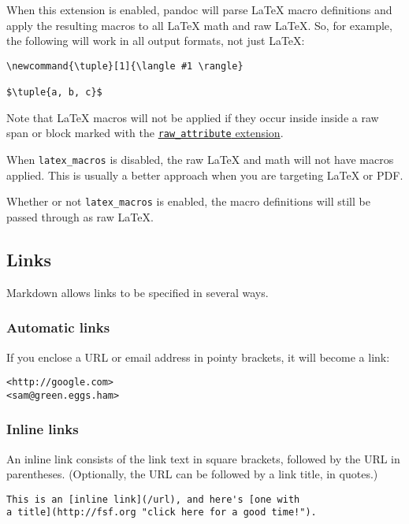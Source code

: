 \documentclass[
]{article}
\begin{document}
When this extension is enabled, pandoc will parse LaTeX macro
definitions and apply the resulting macros to all LaTeX math and raw
LaTeX. So, for example, the following will work in all output formats,
not just LaTeX:

\begin{verbatim}
\newcommand{\tuple}[1]{\langle #1 \rangle}

$\tuple{a, b, c}$
\end{verbatim}

Note that LaTeX macros will not be applied if they occur inside inside a
raw span or block marked with the
\protect\hyperlink{extension-raw_attribute}{\texttt{raw\_attribute}
extension}.

When \texttt{latex\_macros} is disabled, the raw LaTeX and math will not
have macros applied. This is usually a better approach when you are
targeting LaTeX or PDF.

Whether or not \texttt{latex\_macros} is enabled, the macro definitions
will still be passed through as raw LaTeX.

\hypertarget{links-1}{%
\subsection{Links}\label{links-1}}

Markdown allows links to be specified in several ways.

\hypertarget{automatic-links}{%
\subsubsection{Automatic links}\label{automatic-links}}

If you enclose a URL or email address in pointy brackets, it will become
a link:

\begin{verbatim}
<http://google.com>
<sam@green.eggs.ham>
\end{verbatim}

\hypertarget{inline-links}{%
\subsubsection{Inline links}\label{inline-links}}

An inline link consists of the link text in square brackets, followed by
the URL in parentheses. (Optionally, the URL can be followed by a link
title, in quotes.)

\begin{verbatim}
This is an [inline link](/url), and here's [one with
a title](http://fsf.org "click here for a good time!").
\end{verbatim}
\end{document}
